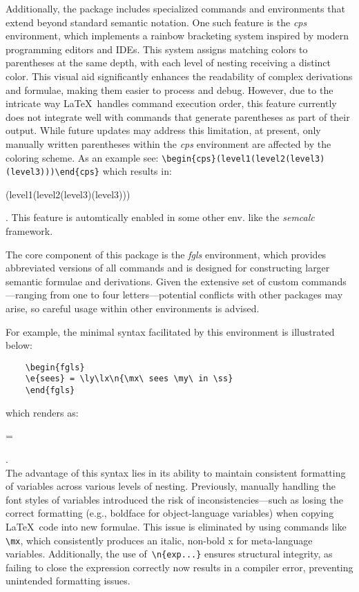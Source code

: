 \documentclass[10pt, a4paper]{article}
\begin{document}
	Additionally, the package includes specialized commands and environments that extend beyond standard semantic notation. One such feature is the \textit{cps} environment, which implements a rainbow bracketing system inspired by modern programming editors and IDEs. This system assigns matching colors to parentheses at the same depth, with each level of nesting receiving a distinct color. This visual aid significantly enhances the readability of complex derivations and formulae, making them easier to process and debug. However, due to the intricate way \LaTeX\ handles command execution order, this feature currently does not integrate well with commands that generate parentheses as part of their output. While future updates may address this limitation, at present, only manually written parentheses within the \textit{cps} environment are affected by the coloring scheme. 
	As an example see: \verb=\begin{cps}(level1(level2(level3)(level3)))\end{cps}= which results in:  \begin{cps}(level1(level2(level3)(level3)))\end{cps}.
	This feature is automtically enabled in some other env. like the \textit{semcalc} framework.
	
	The core component of this package is the \textit{fgls} environment, which provides abbreviated versions of all commands and is designed for constructing larger semantic formulae and derivations. Given the extensive set of custom commands—ranging from one to four letters—potential conflicts with other packages may arise, so careful usage within other environments is advised.
	
	For example, the minimal syntax facilitated by this environment is illustrated below:
	
	\begin{verbatim}
	\begin{fgls}
	\e{sees} = \ly\lx\n{\mx\ sees \my\ in \ss}
	\end{fgls}
	\end{verbatim} which renders as: 
	\\\begin{fgls}
		 = \ly\lx{}
	\end{fgls}.
	\\
	The advantage of this syntax lies in its ability to maintain consistent formatting of variables across various levels of nesting. Previously, manually handling the font styles of variables introduced the risk of inconsistencies—such as losing the correct formatting (e.g., boldface for object-language variables) when copying \LaTeX\ code into new formulae. This issue is eliminated by using commands like \verb=\mx=, which consistently produces an italic, non-bold x for meta-language variables. Additionally, the use of\ \verb=\n{exp...}= ensures structural integrity, as failing to close the expression correctly now results in a compiler error, preventing unintended formatting issues.
	
\end{document}

